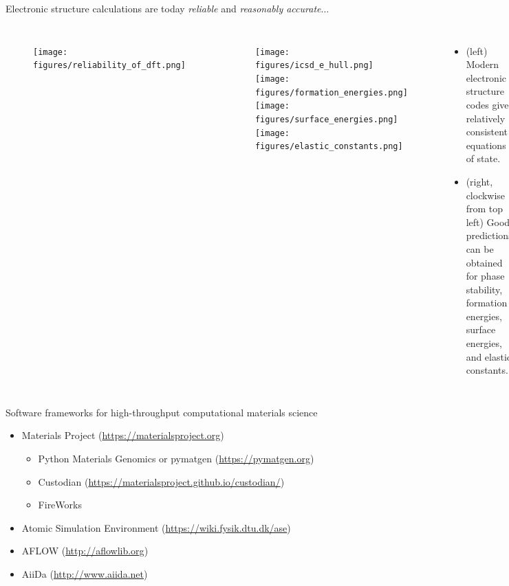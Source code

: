 \documentclass[aspectratio=169]{beamer}
\begin{document}
    \begin{frame}{Electronic structure calculations are today \textit{reliable} and \textit{reasonably accurate}...}

        \begin{columns}
            \begin{figure}
                \centering
                \texttt{[image: figures/reliability\_of\_dft.png]}
            \end{figure}
            \begin{figure}
                \centering
                \texttt{[image: figures/icsd\_e\_hull.png]}
                \texttt{[image: figures/formation\_energies.png]}\\
                \texttt{[image: figures/surface\_energies.png]}
                \texttt{[image: figures/elastic\_constants.png]}
            \end{figure}
            \begin{itemize}
                \tiny
                \item (left) Modern electronic structure codes give relatively consistent equations of state.
                \item (right, clockwise from top left) Good predictions can be obtained for phase stability,\cite{sunThermodynamicScaleInorganic2016} formation energies, surface energies,\cite{tranSurfaceEnergiesElemental2016} and elastic constants\cite{dejongChartingCompleteElastic2015}.
            \end{itemize}
        \end{columns}
    \end{frame}

    \begin{frame}{Software frameworks for high-throughput computational materials science}
        \begin{itemize}
            \item Materials Project (\url{https://materialsproject.org})\cite{jainCommentaryMaterialsProject2013}
            \begin{itemize}
                \item Python Materials Genomics or pymatgen (\url{https://pymatgen.org})\cite{ongPythonMaterialsGenomics2013}
                \item Custodian (\url{https://materialsproject.github.io/custodian/})
                \item FireWorks \cite{jainFireWorksDynamicWorkflow2015}
            \end{itemize}
            \item Atomic Simulation Environment (\url{https://wiki.fysik.dtu.dk/ase})
            \item AFLOW (\url{http://aflowlib.org})\cite{curtaroloAFLOWLIBORGDistributed2012}
            \item AiiDa (\url{http://www.aiida.net})
        \end{itemize}
    \end{frame}
\end{document}
